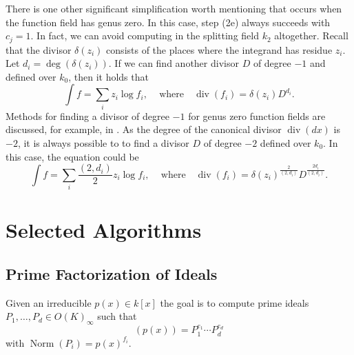 \documentclass[12pt,reqno]{amsart}
\numberwithin{equation}{section}
\newcommand{\op}[1]  { \operatorname{ #1 }}
\begin{document}
There is one other significant simplification worth mentioning that occurs when the function field has genus zero. In this case, step (2e) always succeeds with $c_j=1$. In fact, we can avoid computing in the splitting field $k_2$ altogether. Recall that the divisor $\delta(z_i)$ consists of the places where the integrand has residue $z_i$. Let $d_i=\op{deg}(\delta(z_i))$. If we can find another divisor $D$ of degree $-1$ and defined over $k_0$, then it holds that
\begin{equation*}
 \int f = \sum_{i} z_i \log f_i\text{,} \quad \text{  where} \quad \op{div}(f_i) = \delta(z_i) D^{d_i}\text{.}
\end{equation*}
Methods for finding a divisor of degree $-1$ for genus zero function fields are discussed, for example, in \cite{hoeji}. As the degree of the canonical divisor $\op{div}(dx)$ is $-2$, it is always possible to to find a divisor $D$ of degree $-2$ defined over $k_0$. In this case, the equation could be
\begin{equation*}
 \int f = \sum_{i} \frac{(2,d_i)}{2} z_i \log f_i\text{,} \quad \text{  where} \quad \op{div}(f_i) = \delta(z_i)^{\frac{2}{(2,d_i)}} D^{\frac{2d_i}{(2,d_i)}}\text{.}
\end{equation*}

\section{Selected Algorithms}


\subsection{Prime Factorization of Ideals}

Given an irreducible $p(x) \in k[x]$ the goal is to compute prime ideals $P_1,\dots,P_d \in O(K)_{\infty}$ such that
\begin{equation*}
 (p(x)) = P_1 ^{e_1} \cdots P_d^{e_d}
\end{equation*}
with $\op{Norm}(P_i) = p(x)^{f_i}$.
\end{document}

